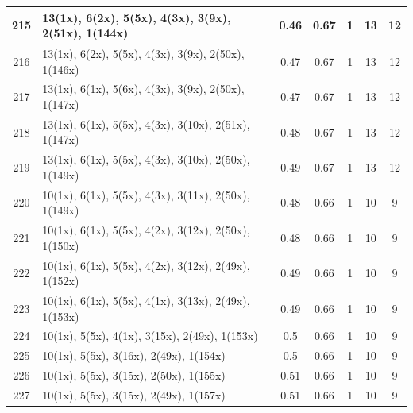 \begin{small}
\begin{longtable}{|c|p{4cm}|c|c|c|c|c|}
  215 & 13(1x), 6(2x), 5(5x), 4(3x), 3(9x), 2(51x), 1(144x) & \cellcolor{colorGood}  0.46 & \cellcolor{colorGood} 0.67 & 1 & 13 & \cellcolor{colorGood} 12 \\   \hline
  216 & 13(1x), 6(2x), 5(5x), 4(3x), 3(9x), 2(50x), 1(146x) & \cellcolor{colorGood}  0.47 & \cellcolor{colorGood} 0.67 & 1 & 13 & \cellcolor{colorGood} 12 \\   \hline
  217 & 13(1x), 6(1x), 5(6x), 4(3x), 3(9x), 2(50x), 1(147x) & \cellcolor{colorGood}  0.47 & \cellcolor{colorGood} 0.67 & 1 & 13 & \cellcolor{colorGood} 12 \\   \hline
  218 & 13(1x), 6(1x), 5(5x), 4(3x), 3(10x), 2(51x), 1(147x) & \cellcolor{colorGood}  0.48 & \cellcolor{colorGood} 0.67 & 1 & 13 & \cellcolor{colorGood} 12 \\   \hline
  219 & 13(1x), 6(1x), 5(5x), 4(3x), 3(10x), 2(50x), 1(149x) & \cellcolor{colorGood}  0.49 & \cellcolor{colorGood} 0.67 & 1 & 13 & \cellcolor{colorGood} 12 \\   \hline
  220 & 10(1x), 6(1x), 5(5x), 4(3x), 3(11x), 2(50x), 1(149x) & \cellcolor{colorGood}  0.48 & \cellcolor{colorGood} 0.66 & 1 & 10 & \cellcolor{colorGood} 9 \\   \hline
  221 & 10(1x), 6(1x), 5(5x), 4(2x), 3(12x), 2(50x), 1(150x) & \cellcolor{colorGood}  0.48 & \cellcolor{colorGood} 0.66 & 1 & 10 & \cellcolor{colorGood} 9 \\   \hline
  222 & 10(1x), 6(1x), 5(5x), 4(2x), 3(12x), 2(49x), 1(152x) & \cellcolor{colorGood}  0.49 & \cellcolor{colorGood} 0.66 & 1 & 10 & \cellcolor{colorGood} 9 \\   \hline
  223 & 10(1x), 6(1x), 5(5x), 4(1x), 3(13x), 2(49x), 1(153x) & \cellcolor{colorGood}  0.49 & \cellcolor{colorGood} 0.66 & 1 & 10 & \cellcolor{colorGood} 9 \\   \hline
  224 & 10(1x), 5(5x), 4(1x), 3(15x), 2(49x), 1(153x) & \cellcolor{colorGood}  0.5 & \cellcolor{colorGood} 0.66 & 1 & 10 & \cellcolor{colorGood} 9 \\   \hline
  225 & 10(1x), 5(5x), 3(16x), 2(49x), 1(154x) & \cellcolor{colorGood}  0.5 & \cellcolor{colorGood} 0.66 & 1 & 10 & \cellcolor{colorGood} 9 \\   \hline
  226 & 10(1x), 5(5x), 3(15x), 2(50x), 1(155x) & \cellcolor{colorGood}  0.51 & \cellcolor{colorGood} 0.66 & 1 & 10 & \cellcolor{colorGood} 9 \\   \hline
  227 & 10(1x), 5(5x), 3(15x), 2(49x), 1(157x) & \cellcolor{colorGood}  0.51 & \cellcolor{colorGood} 0.66 & 1 & 10 & \cellcolor{colorGood} 9 \\   \hline

\end{longtable}
\end{small}
